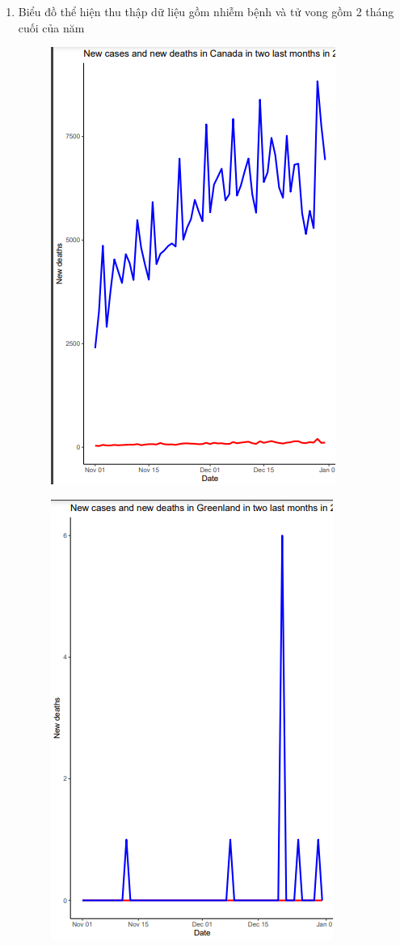 \documentclass[a4paper]{article}
\theoremstyle{definition}
\begin{document}
\begin{enumerate}[i)]
\begin{enumerate}[1]
\begin{figure}[H]
			\end{figure}
			\item Biểu đồ thể hiện thu thập dữ liệu gồm nhiễm bệnh và tử vong gồm 2 tháng cuối của năm
			\begin{figure}[H]
				\centering
				\includegraphics[scale=0.8]{images/5.6.1.png}
			\end{figure}
			\begin{figure}[H]
				\centering
				\includegraphics[scale=0.8]{images/5.6.2.png}

\end{figure}
\end{enumerate}
\end{enumerate}
\end{document}
